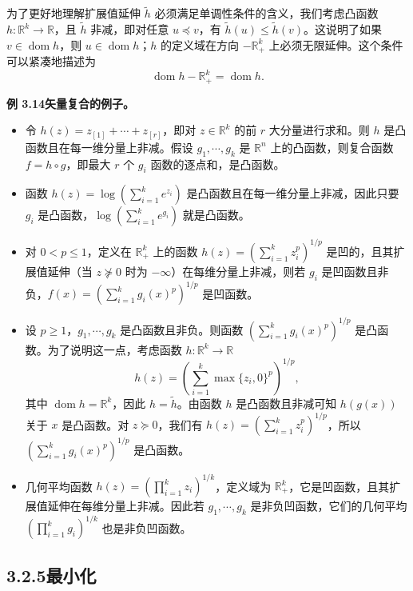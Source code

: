 \documentclass[UTF8, 12pt, fontset=fandol, oneside]{ctexart}
\DeclareMathOperator{\dom}{dom}
\begin{document}
为了更好地理解扩展值延伸 $\tilde h$ 必须满足单调性条件的含义，我们考虑凸函数 $h:\mathbb{R}^k\to\mathbb{R}$，且 $\tilde h$ 非减，即对任意 $u\preceq v$，有 $\tilde h(u)\leq \tilde h(v)$。这说明了如果 $v\in\dom h$，则 $u\in\dom h$；$h$ 的定义域在方向 $-\mathbb{R}_+^k$ 上必须无限延伸。这个条件可以紧凑地描述为
\[
\dom h-\mathbb{R}_+^k=\dom h.
\]

\noindent\textbf{例 3.14\quad 矢量复合的例子。}
\begin{itemize}
\item 令 $h(z)=z_{[1]}+\cdots+z_{[r]}$，即对 $z\in\mathbb{R}^k$ 的前 $r$ 大分量进行求和。则 $h$ 是凸函数且在每一维分量上非减。假设 $g_1,\cdots,g_k$ 是 $\mathbb{R}^n$ 上的凸函数，则复合函数 $f=h\circ g$，即最大 $r$ 个 $g_i$ 函数的逐点和，是凸函数。
\item 函数 $h(z)=\log\left(\sum_{i=1}^k e^{z_i}\right)$ 是凸函数且在每一维分量上非减，因此只要 $g_i$ 是凸函数，$\log\left(\sum_{i=1}^k e^{g_i}\right)$ 就是凸函数。
\item 对 $0<p\leq1$，定义在 $\mathbb{R}_+^k$ 上的函数 $h(z)=\left(\sum_{i=1}^k z_i^p\right)^{1/p}$ 是凹的，且其扩展值延伸（当 $z\nsucceq0$ 时为 $-\infty$）在每维分量上非减，则若 $g_i$ 是凹函数且非负，$f(x)=\left(\sum_{i=1}^k g_i(x)^p\right)^{1/p}$ 是凹函数。
\item 设 $p\geq1$，$g_1,\cdots,g_k$ 是凸函数且非负。则函数 $\left(\sum_{i=1}^k g_i(x)^p\right)^{1/p}$ 是凸函数。为了说明这一点，考虑函数 $h:\mathbb{R}^k\to\mathbb{R}$
\[
h(z)=\left(\sum_{i=1}^k \max\{z_i,0\}^p\right)^{1/p},
\]
其中 $\dom h=\mathbb{R}^k$，因此 $h=\tilde h$。由函数 $h$ 是凸函数且非减可知 $h(g(x))$ 关于 $x$ 是凸函数。对 $z\succeq0$，我们有 $h(z)=\left(\sum_{i=1}^k z_i^p\right)^{1/p}$，所以 $\left(\sum_{i=1}^k g_i(x)^p\right)^{1/p}$ 是凸函数。
\item 几何平均函数 $h(z)=\left(\prod_{i=1}^k z_i\right)^{1/k}$，定义域为 $\mathbb{R}_+^k$，它是凹函数，且其扩展值延伸在每维分量上非减。因此若 $g_1,\cdots,g_k$ 是非负凹函数，它们的几何平均 $\left(\prod_{i=1}^k g_i\right)^{1/k}$ 也是非负凹函数。
\end{itemize}

\subsection*{3.2.5\quad 最小化}
\end{document}
